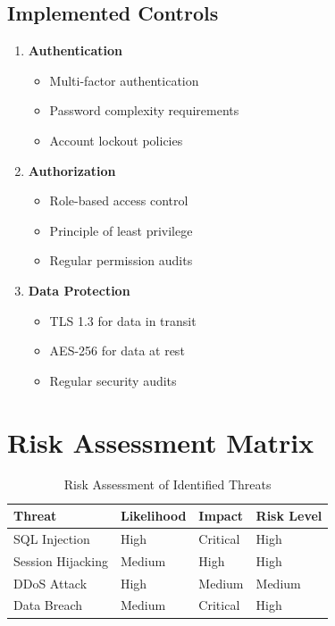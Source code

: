 \documentclass{article}
\begin{document}
\subsection{Implemented Controls}
\begin{enumerate}
    \item \textbf{Authentication}
    \begin{itemize}
        \item Multi-factor authentication
        \item Password complexity requirements
        \item Account lockout policies
    \end{itemize}
    
    \item \textbf{Authorization}
    \begin{itemize}
        \item Role-based access control
        \item Principle of least privilege
        \item Regular permission audits
    \end{itemize}
    
    \item \textbf{Data Protection}
    \begin{itemize}
        \item TLS 1.3 for data in transit
        \item AES-256 for data at rest
        \item Regular security audits
    \end{itemize}
\end{enumerate}

\section{Risk Assessment Matrix}

\begin{table}[H]
\centering
\begin{tabular}{|l|l|l|l|}
\hline
\textbf{Threat} & \textbf{Likelihood} & \textbf{Impact} & \textbf{Risk Level} \\
\hline
SQL Injection & High & Critical & High \\
Session Hijacking & Medium & High & High \\
DDoS Attack & High & Medium & Medium \\
Data Breach & Medium & Critical & High \\
\hline
\end{tabular}
\caption{Risk Assessment of Identified Threats}
\end{table}
\end{document}
